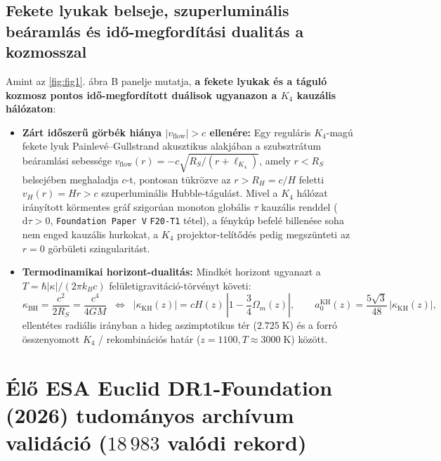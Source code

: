 \documentclass[11pt,a4paper]{article}
\begin{document}
\subsection{Fekete lyukak belseje, szuperluminális beáramlás és idő-megfordítási dualitás a kozmosszal}

Amint az \ref{fig:fig1}. ábra B panelje mutatja, \textbf{a fekete lyukak és a táguló kozmosz pontos idő-megfordított duálisok ugyanazon a $K_4$ kauzális hálózaton}:
\begin{itemize}
  \item \textbf{Zárt időszerű görbék hiánya $|v_{\mathrm{flow}}| > c$ ellenére:} Egy reguláris $K_4$-magú fekete lyuk Painlevé--Gullstrand akusztikus alakjában a szubsztrátum beáramlási sebessége $v_{\mathrm{flow}}(r) = -c\sqrt{R_S/(r + \ell_{K_4})}$, amely $r < R_S$ belsejében meghaladja $c$-t, pontosan tükrözve az $r > R_H = c/H$ feletti $v_H(r) = H r > c$ szuperluminális Hubble-tágulást. Mivel a $K_4$ hálózat irányított körmentes gráf szigorúan monoton globális $\tau$ kauzális renddel ($\mathrm{d}\tau > 0$, \texttt{Foundation Paper V} \texttt{F20-T1} tétel), a fénykúp befelé billenése soha nem enged kauzális hurkokat, a $K_4$ projektor-telítődés pedig megszünteti az $r = 0$ görbületi szingularitást.
  \item \textbf{Termodinamikai horizont-dualitás:} Mindkét horizont ugyanazt a $T = \hbar |\kappa|/(2\pi k_B c)$ felületigravitáció-törvényt követi:
  \begin{equation}
    \kappa_{\mathrm{BH}} = \frac{c^2}{2 R_S} = \frac{c^4}{4 G M} \;\;\Longleftrightarrow\;\;
    |\kappa_{\mathrm{KH}}(z)| = c H(z)\,\left|1 - \frac{3}{4}\Omega_m(z)\right|, \qquad
    a_0^{\mathrm{KH}}(z) = \frac{5\sqrt{3}}{48}\,|\kappa_{\mathrm{KH}}(z)|,
  \end{equation}
  ellentétes radiális irányban a hideg aszimptotikus tér ($2.725\;\mathrm{K}$) és a forró összenyomott $K_4$ / rekombinációs határ ($z = 1100, T \approx 3000\;\mathrm{K}$) között.
\end{itemize}

\newpage
\section{Élő ESA Euclid DR1-Foundation (2026) tudományos archívum validáció (\texorpdfstring{$18\,983$}{18,983} valódi rekord)}
\end{document}
